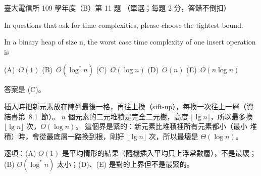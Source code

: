 \begin{pastexam}[label={px:ntu-109-comm-dsa-11}]{臺大電信所 109 學年度（B）第 11 題}
（單選；每題 2 分，答錯不倒扣）

In questions that ask for time complexities, please choose the tightest bound.

In a binary heap of size n, the worst case time complexity of one insert operation is

(A)~$O(1)$ \qquad (B)~$O(\log^* n)$ \qquad (C)~$O(\log n)$ \qquad (D)~$O(n)$ \qquad (E)~$O(n\log n)$
\end{pastexam}

\begin{pastsoln}
答案是 (C)。

插入時把新元素放在陣列最後一格，再往上換（sift-up），每換一次往上一層（資結書第~8.1~節）。
$n$ 個元素的二元堆積是完全二元樹，高度 $\lfloor \lg n \rfloor$，所以最多換
$\lfloor \lg n \rfloor$ 次，$O(\log n)$。 這個界是緊的：新元素比堆積裡所有元素都小（最小
堆積）時，會從最底層一路換到根，剛好 $\lfloor \lg n \rfloor$ 次，所以最壞是
$\Theta(\log n)$。

逐項：(A) $O(1)$ 是平均情形的結果（隨機插入平均只上浮常數層），不是最壞；(B) $O(\log^* n)$
太小；(D)、(E) 是對的上界但不是最緊的。
\end{pastsoln}
